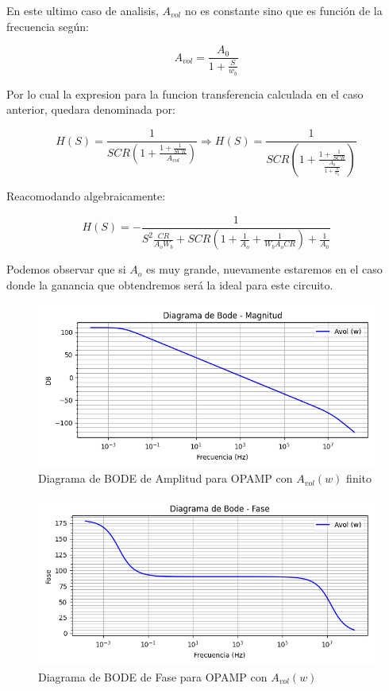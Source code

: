 En este ultimo caso de analisis, $A_{vol}$ no es constante sino que es función de la frecuencia según:

$$A_{vol}=\frac{A_0}{1+\frac{S}{w_b}}$$

Por lo cual la expresion para la funcion transferencia calculada en el caso anterior, quedara denominada por:

$$H(S)= \frac{1}{SCR(1+\frac{1+\frac{1}{SCR}}{A_{vol}})}\Longrightarrow H(S)= \frac{1}{SCR(1+\frac{1+\frac{1}{SCR}}{\frac{A_0}{1+\frac{S}{w_b}}})}$$ 

Reacomodando algebraicamente:

$$H(S)=- \frac{1}{S^2\frac{CR}{A_oW_b}+SCR(1 + \frac{1}{A_o}+\frac{1}{W_bA_oCR}) + \frac{1}{A_0}}$$

Podemos observar que si $A_o$ es muy grande, nuevamente estaremos en el caso donde la ganancia que obtendremos será la ideal para este circuito.

\begin{figure}[H]
    \centering 
    \includegraphics [scale=1] {../Ejercicio3-CircuitoIntegradoresyDerivadores/Imagenes/diagrama-bode-noideal-amplitud.png} 
    \caption{Diagrama de BODE de Amplitud para OPAMP con $A_{vol}(w)$ finito}
    \label{fig:emptyPlotTool}
\end{figure}

\begin{figure}[H]
    \centering 
    \includegraphics [scale=1] {../Ejercicio3-CircuitoIntegradoresyDerivadores/Imagenes/diagrama-bode-noideal-fase.png} 
    \caption{Diagrama de BODE de Fase para OPAMP con $A_{vol}(w)$ }
    \label{fig:emptyPlotTool}
\end{figure}


